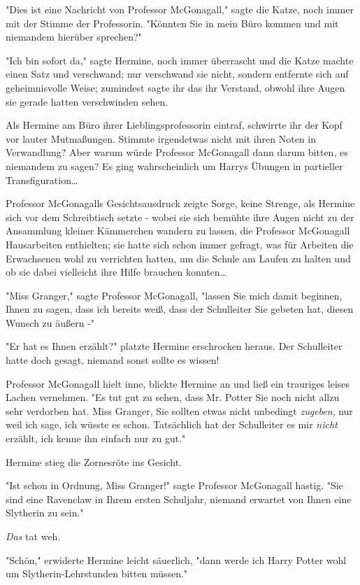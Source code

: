 {"Dies ist eine Nachricht von Professor McGonagall," sagte die Katze, noch immer mit der Stimme der Professorin. "Könnten Sie in mein Büro kommen und mit niemandem hierüber sprechen?"

"Ich bin sofort da," sagte Hermine, noch immer überrascht und die Katze machte einen Satz und verschwand; nur verschwand sie nicht, sondern entfernte sich auf geheimnisvolle Weise; zumindest sagte ihr das ihr Verstand, obwohl ihre Augen sie gerade hatten verschwinden sehen.

Als Hermine am Büro ihrer Lieblingsprofessorin eintraf, schwirrte ihr der Kopf vor lauter Mutmaßungen. Stimmte irgendetwas nicht mit ihren Noten in Verwandlung? Aber warum würde Professor McGonagall dann darum bitten, es niemandem zu sagen? Es ging wahrscheinlich um Harrys Übungen in partieller Transfiguration…

Professor McGonagalls Gesichtsausdruck zeigte Sorge, keine Strenge, als Hermine sich vor dem Schreibtisch setzte - wobei sie sich bemühte ihre Augen nicht zu der Ansammlung kleiner Kämmerchen wandern zu lassen, die Professor McGonagall Hausarbeiten enthielten; sie hatte sich schon immer gefragt, was für Arbeiten die Erwachsenen wohl zu verrichten hatten, um die Schule am Laufen zu halten und ob sie dabei vielleicht ihre Hilfe brauchen konnten…

"Miss Granger," sagte Professor McGonagall, "lassen Sie mich damit beginnen, Ihnen zu sagen, dass ich bereits weiß, dass der Schulleiter Sie gebeten hat, diesen Wunsch zu äußern -"

"Er hat es Ihnen erzählt?" platzte Hermine erschrocken heraus. Der Schulleiter hatte doch gesagt, niemand sonst sollte es wissen!

Professor McGonagall hielt inne, blickte Hermine an und ließ ein trauriges leises Lachen vernehmen. "Es tut gut zu sehen, dass Mr. Potter Sie noch nicht allzu sehr verdorben hat. Miss Granger, Sie sollten etwas nicht unbedingt \emph{zugeben}, nur weil ich sage, ich wüsste es schon. Tatsächlich hat der Schulleiter es mir \emph{nicht} erzählt, ich kenne ihn einfach nur zu gut."

Hermine stieg die Zornesröte ins Gesicht.

"Ist schon in Ordnung, Miss Granger!" sagte Professor McGonagall hastig. "Sie sind eine Ravenclaw in Ihrem ersten Schuljahr, niemand erwartet von Ihnen eine Slytherin zu sein."

\emph{Das} tat weh.

"Schön," erwiderte Hermine leicht säuerlich, "dann werde ich Harry Potter wohl um Slytherin-Lehrstunden bitten müssen."

}
